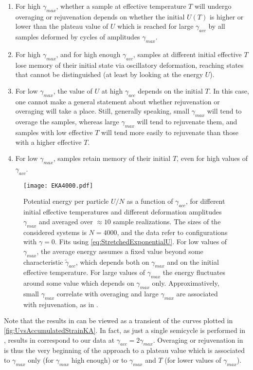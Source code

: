 \begin{enumerate}
	\item For high $\gamma_{max}$, whether a sample at effective temperature $T$ will undergo overaging or rejuvenation depends on whether the initial $U(T)$ is higher or lower than the plateau value of $U$ which is reached for large $\gamma_{acc}$ by all samples deformed by cycles of amplitudes $\gamma_{max}$.
	\item For high $\gamma_{max}$, and for high enough $\gamma_{acc}$, samples at different initial effective $T$ lose memory of their initial state via oscillatory deformation, reaching states that cannot be distinguished (at least by looking at the energy $U$).
	\item For low $\gamma_{max}$, the value of $U$ at high $\gamma_{acc}$ depends on the initial $T$. In this case, one cannot make a general statement about whether rejuvenation or overaging will take a place. Still, generally speaking, small $\gamma_{max}$ will tend to overage the samples, whereas large $\gamma_{max}$ will tend to rejuvenate them, and samples with low effective $T$ will tend more easily to rejuvenate than those with a higher effective $T$.
	\item For low $\gamma_{max}$, samples retain memory of their initial $T$, even for high values of $\gamma_{acc}$.
\end{enumerate}

\begin{figure}[!h] 
\centering 
\texttt{[image: EKA4000.pdf]} 
\caption{Potential energy per particle $U/N$ as a function of $\gamma_{acc}$, for different initial effective temperatures and different deformation amplitudes $\gamma_{max}$ and averaged over $\approx 10$ sample realizations. The sizes of the considered systems is $N=4000$, and the data refer to configurations with $\gamma = 0$. Fits using \autoref{eq:StretchedExponentialU}. For low values of $\gamma_{max}$, the average energy assumes a fixed value beyond some characteristic $\widetilde{\gamma}_{acc}$, which depends both on $\gamma_{max}$ and on the initial effective temperature. For large values of $\gamma_{max}$ the energy fluctuates around some value which depends on $\gamma_{max}$ only. Approximatively, small $\gamma_{max}$ correlate with overaging and large $\gamma_{max}$ are associated with rejuvenation, as in \cite{lacks2004energy}. \label{fig:UvsAccumulatedStrainKA}}
\end{figure}

Note that the results in \cite{lacks2004energy} can be viewed as a transient of the curves plotted in \autoref{fig:UvsAccumulatedStrainKA}. In fact, as just a single semicycle is performed in \cite{lacks2004energy}, results in \cite{lacks2004energy} correspond to our data at $\gamma_{acc} = 2\gamma_{max}$. Overaging or rejuvenation in \cite{lacks2004energy} is thus the very beginning of the approach to a plateau value which is associated to $\gamma_{max}$ only (for $\gamma_{max}$ high enough) or to $\gamma_{max}$ and $T$ (for lower values of $\gamma_{max}$).

